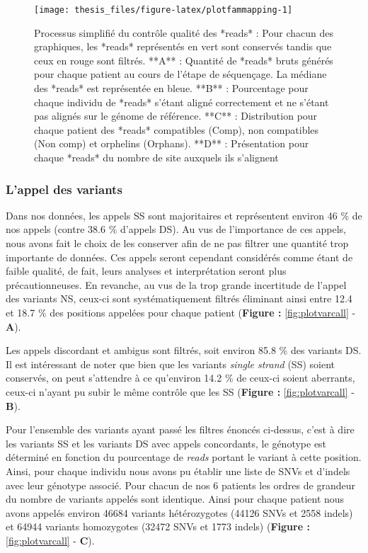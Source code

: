 \documentclass[12pt,twoside]{reedthesis}
\theoremstyle{definition}
\theoremstyle{definition}
\theoremstyle{remark}
\begin{document}
  \begin{figure}
  
  {\centering \texttt{[image: thesis\_files/figure-latex/plotfammapping-1]} 
  
  }
  
  \caption[Processus simplifié du contrôle qualité des *reads*]{Processus simplifié du contrôle qualité des *reads* : Pour chacun des graphiques, les *reads* représentés en vert sont conservés tandis que ceux en rouge sont filtrés. **A** : Quantité de *reads* bruts générés pour chaque patient au cours de l'étape de séquençage. La médiane des *reads* est représentée en bleue. **B** : Pourcentage pour chaque individu de *reads* s'étant aligné correctement et ne s'étant pas alignés sur le génome de référence. **C** : Distribution pour chaque patient des *reads* compatibles (Comp), non compatibles (Non comp) et orphelins (Orphans). **D** : Présentation pour chaque *reads* du nombre de site auxquels ils s'alignent}\label{fig:plotfammapping}
  \end{figure}
  
  \newpage  
  
  \subsubsection{L'appel des variants}\label{lappel-des-variants-1}
  
  Dans nos données, les appels SS sont majoritaires et représentent
  environ 46 \% de nos appels (contre 38.6 \% d'appels DS). Au vus de
  l'importance de ces appels, nous avons fait le choix de les conserver
  afin de ne pas filtrer une quantité trop importante de données. Ces
  appels seront cependant considérés comme étant de faible qualité, de
  fait, leurs analyses et interprétation seront plus précautionneuses. En
  revanche, au vus de la trop grande incertitude de l'appel des variants
  NS, ceux-ci sont systématiquement filtrés éliminant ainsi entre 12.4 et
  18.7 \% des positions appelées pour chaque patient (\textbf{Figure :
  }\ref{fig:plotvarcall} - \textbf{A}).
  
  Les appels discordant et ambigus sont filtrés, soit environ 85.8 \% des
  variants DS. Il est intéressant de noter que bien que les variants
  \emph{single strand} (SS) soient conservés, on peut s'attendre à ce
  qu'environ 14.2 \% de ceux-ci soient aberrants, ceux-ci n'ayant pu subir
  le même contrôle que les SS (\textbf{Figure : }\ref{fig:plotvarcall} -
  \textbf{B}).
  
  Pour l'ensemble des variants ayant passé les filtres énoncés ci-dessus,
  c'est à dire les variants SS et les variants DS avec appels concordants,
  le génotype est déterminé en fonction du pourcentage de \emph{reads}
  portant le variant à cette position. Ainsi, pour chaque individu nous
  avons pu établir une liste de SNVs et d'indels avec leur génotype
  associé. Pour chacun de nos 6 patients les ordres de grandeur du nombre
  de variants appelés sont identique. Ainsi pour chaque patient nous avons
  appelés environ 46684 variants hétérozygotes (44126 SNVs et 2558 indels)
  et 64944 variants homozygotes (32472 SNVs et 1773 indels)
  (\textbf{Figure : }\ref{fig:plotvarcall} - \textbf{C}).
  
\end{document}

